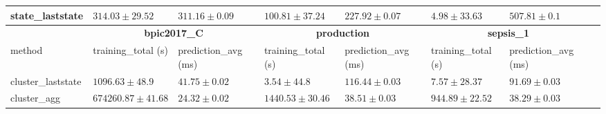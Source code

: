 \documentclass[twoside,11pt]{Latex/Classes/PhDthesisPSnPDF}
\begin{document}
\begin{table}[h]
{\begin{tabular}{llllllll}
			state\_laststate & $314.03 \pm 29.52$ & $311.16 \pm 0.09$ & $100.81 \pm 37.24$ & $227.92 \pm 0.07$ & $4.98 \pm 33.63$ & $507.81 \pm 0.1$ \\ 
			\bottomrule
			\toprule
			& \multicolumn{2}{c}{{\bfseries bpic2017\_C}} & \multicolumn{2}{c}{{\bfseries production}} & \multicolumn{2}{c}{{\bfseries sepsis\_1}} \\ \cmidrule(lr){2-3} \cmidrule(lr){4-5} \cmidrule(lr){6-7}
			method  & training\_total (s) & prediction\_avg (ms) & training\_total (s) & prediction\_avg (ms) & training\_total (s) & prediction\_avg (ms) \\ \midrule
			cluster\_laststate & $1096.63 \pm 48.9$ & $41.75 \pm 0.02$ & $3.54 \pm 44.8$ & $116.44 \pm 0.03$ & $7.57 \pm 28.37$ & $91.69 \pm 0.03$ \\ 
			cluster\_agg & $674260.87 \pm 41.68$ & $\mathbf{24.32 \pm 0.02}$ & $1440.53 \pm 30.46$ & $38.51 \pm 0.03$ & $944.89 \pm 22.52$ & $38.29 \pm 0.03$ \\ 
			

\end{tabular}}
\end{table}
\end{document}
